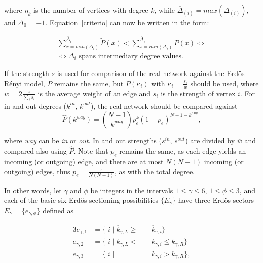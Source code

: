 \documentclass[%
aip,
jmp,%
amsmath,amssymb,
reprint,%
]{revtex4-1}
\begin{document}
\noindent where $\eta_k$ is the number of vertices with degree $k$,
while $\overline{\Delta}_{(i)}=max(\Delta_{(i)})$, and $\overline{\Delta}_{0}=-1$.
Equation~\ref{criterio} can now be written in the form:

\begin{equation}\label{criterio2}
\begin{split}
\sum_{x=min(\Delta_i)}^{\overline{\Delta}_i} \widetilde{P}(x) < \sum_{x=min(\Delta_i)}^{\overline{\Delta}_i} P(x) \Leftrightarrow \\
\Leftrightarrow \Delta_i \text{ spans intermediary degree values.}
\end{split}
\end{equation}

If the strength $s$ is used for comparison of the real network against the Erd\"os-R\'enyi model,
$P$ remains the same, but $P(\kappa_i)$ with $\kappa_i=\frac{s_i}{\overline{w}}$ should be used, where $\overline{w}=2\frac{z}{\sum_is_i}$ is the average weight of an edge and $s_i$ is the strength of vertex $i$. For in and out degrees ($k^{in}$, $k^{out}$), the real network should be compared against
\begin{equation}
\hat{P}(k^{way})=\binom{N-1}{k^{way}}p_e^k(1-p_e)^{N-1-k^{way}},
\end{equation}

\noindent where \emph{way} can be \emph{in} or \emph{out}. In and out strengths ($s^{in}$, $s^{out}$) are divided by $\overline{w}$ and compared also using $\hat{P}$. Note that $p_e$ remains the same, as each edge yields an incoming (or outgoing) edge, and there are at most $N(N-1)$ incoming (or outgoing) edges, thus $p_e=\frac{z}{N(N-1)}$, as with the total degree.

In other words, let $\gamma$ and $\phi$ be integers in the intervals $1 \leq \gamma \leq 6$, $1 \leq \phi \leq 3$, and each of the basic six Erd\"os sectioning possibilities $\{E_{\gamma}\}$ have three Erd\"os sectors $E_{\gamma}= \{e_{\gamma, \phi} \}$ defined as

\begin{alignat}{3}\label{eq:part}
e_{\gamma,1}&=\{\;i\;|\;\overline{k}_{\gamma,L}\geq&&\overline{k}_{\gamma,i}\} \nonumber \\
e_{\gamma,2}&=\{\;i\;|\;\overline{k}_{\gamma,L}<\;&&\overline{k}_{\gamma,i}\leq\overline{k}_{\gamma,R}\} \\ 
e_{\gamma,3}&=\{\;i\;|\;&&\overline{k}_{\gamma,i}>\overline{k}_{\gamma,R}\} \nonumber,
\end{alignat}
\end{document}

